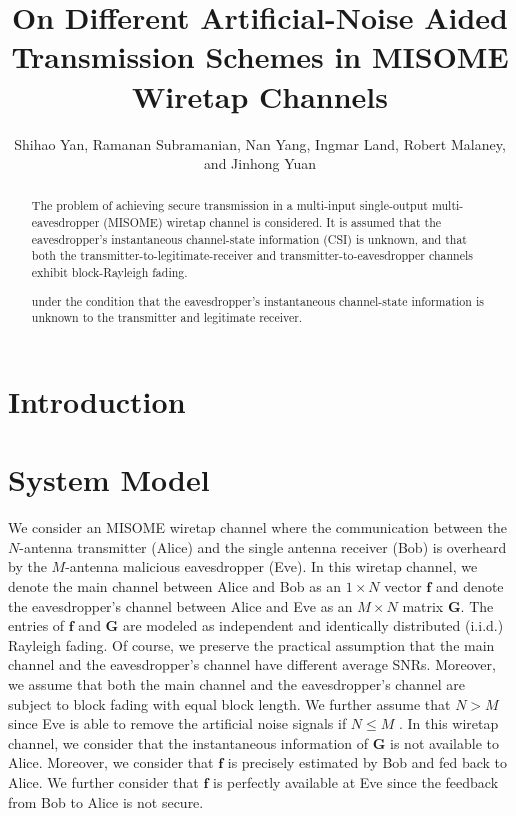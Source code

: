 \documentclass[journal]{IEEEtran}
\begin{document}
\title{On Different Artificial-Noise Aided Transmission Schemes in MISOME Wiretap Channels}

\author{Shihao Yan, Ramanan Subramanian, Nan Yang, Ingmar Land, Robert Malaney, and Jinhong Yuan}

\maketitle

\begin{abstract}
The problem of achieving secure transmission in a multi-input single-output multi-eavesdropper (MISOME) wiretap channel is considered. It is assumed that the eavesdropper's instantaneous channel-state information (CSI) is unknown, and that both the transmitter-to-legitimate-receiver and transmitter-to-eavesdropper channels exhibit block-Rayleigh fading. 

 under the condition that the eavesdropper's instantaneous channel-state information is unknown to the transmitter and legitimate receiver. \end{abstract}

\section{Introduction}
\section{System Model}

We consider an MISOME wiretap channel where the communication
between the $N$-antenna transmitter (Alice) and the single antenna
receiver (Bob) is overheard by the $M$-antenna malicious eavesdropper
(Eve). In this wiretap channel, we denote the main channel between
Alice and Bob as an $1\times{}N$ vector $\mathbf{f}$ and denote the
eavesdropper's channel between Alice and Eve as an $M \times N$
matrix $\mathbf{G}$. The entries of $\mathbf{f}$ and $\mathbf{G}$ are modeled as
independent and identically distributed (i.i.d.) Rayleigh fading.
Of course, we preserve the practical assumption that the main
channel and the eavesdropper's channel have different average SNRs.
Moreover, we assume that both the main channel and the
eavesdropper's channel are subject to block fading with equal block length. We
further assume that $N > M$ since Eve is able to remove the artificial
noise signals if $N \leq M$ \cite{Zhou}. In this wiretap channel, we
consider that the instantaneous information of $\mathbf{G}$ is not
available to Alice. Moreover, we consider that $\mathbf{f}$ is
precisely estimated by Bob and fed back to Alice. We further
consider that $\mathbf{f}$ is perfectly available at Eve since the
feedback from Bob to Alice is not secure.
\end{document}
